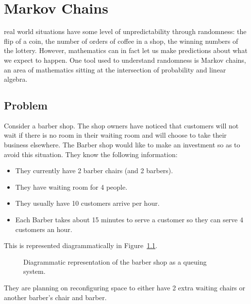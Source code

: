 \chapter[Markov Chains]{Markov Chains}

 real world situations have some level of
unpredictability through randomness: the flip of a coin, the number of orders of
coffee in a shop, the winning numbers of the lottery. However, mathematics can
in fact let us make predictions about what we expect to happen. One tool used to
understand randomness is Markov chains, an area of mathematics sitting at the
intersection of probability and linear algebra.

\section{Problem}\label{sec:problem}

Consider a barber shop. The shop owners have noticed that customers will not
wait if there is no room in their waiting room and will choose to take their
business elsewhere. The Barber shop would like to make an investment so as to
avoid this situation. They know the following information:

\begin{itemize}
    \item They currently have 2 barber chairs (and 2 barbers).
    \item They have waiting room for 4 people.
    \item They usually have 10 customers arrive per hour.
    \item Each Barber takes about 15 minutes to serve a customer so they can
        serve 4 customers an hour.
\end{itemize}

This is represented diagrammatically in Figure~\ref{fig:barber-shop}.

\begin{figure}[!hbtp]
    \begin{center}
    
    \end{center}
    \caption{Diagrammatic representation of the barber shop as a queuing system.}
    \label{fig:barber-shop}
\end{figure}


They are planning on
reconfiguring space to either have 2 extra waiting chairs or
another barber's chair and barber.

